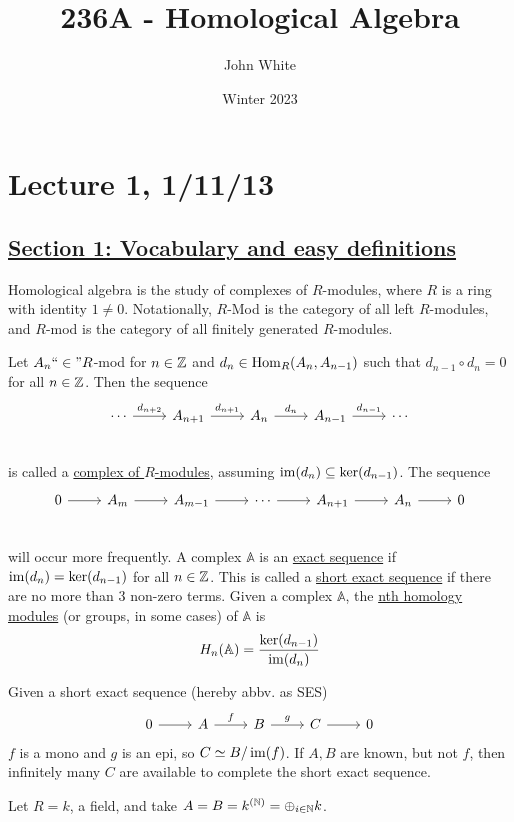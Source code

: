\documentclass[x11names,reqno,14pt]{extarticle}
\title{236A - Homological Algebra}
\author{John White}
\date{Winter 2023}
\newcommand{\A}{\mathbb{A}}
\newcommand{\fin}{``\in"}
\begin{document}
\section*{Lecture 1, 1/11/13}

\subsection*{\underline{Section 1: Vocabulary and easy definitions}}

Homological algebra is the study of complexes of $R$-modules, where $R$ is a ring with identity $1\neq0$. Notationally, $R$-Mod is the category of all left $R$-modules, and $R$-mod is the category of all finitely generated $R$-modules. 


Let $A_n\fin R$-mod for $n\in\mathbb{Z}$ and $d_n\in{\mathrm{Hom}}_R(A_n, A_{n - 1})$ such that $d_{n - 1}\circ d_n = 0$ for all $n \in\mathbb{Z}$. Then the sequence
\[
\begin{tikzcd}
\cdots\ar[r, "d_{n + 2}"]& A_{n + 1}\ar[r, "d_{n + 1}"] & A_n \ar[r, "d_n"] & A_{n - 1} \ar[r, "d_{n - 1}"] & \cdots\\
\end{tikzcd}
\]
is called a \underline{complex of $R$-modules}, assuming $\operatorname{\mathrm{im}}(d_n) \subseteq \ker(d_{n - 1})$. The sequence
\[
\begin{tikzcd}
0\ar[r]&A_m\ar[r]&A_{m - 1}\ar[r]&\cdots\ar[r]&A_{n + 1}\ar[r]&A_n\ar[r]&0 \\
\end{tikzcd}
\]
will occur more frequently. A complex $\A$ is an \underline{exact sequence} if $\operatorname{\mathrm{im}}(d_n) = \ker(d_{n - 1})$ for all $n \in \mathbb{Z}$. This is called a \underline{short exact sequence} if there are no more than 3 non-zero terms. Given a complex $\A$, the \underline{nth homology modules} (or groups, in some cases) of $\A$ is
\[
H_n(\A) = \frac{\ker(d_{n -1})}{\im(d_n)}
\]

\rem

Given a short exact sequence (hereby abbv. as SES) 
\[
\begin{tikzcd}
0\ar[r]&A\ar[r,"f"]&B\ar[r,"g"]&C\ar[r]&0
\end{tikzcd}
\]
$f$ is a mono and $g$ is an epi, so $C\simeq B/\operatorname{\mathrm{im}}(f)$. If $A, B$ are known, but not $f$, then infinitely many $C$ are available to complete the short exact sequence.

\exm 

Let $R = k$, a field, and take $A = B = k^{(\mathbb{N})} = \oplus_{i\in\mathbb{N}}k$.
\end{document}
